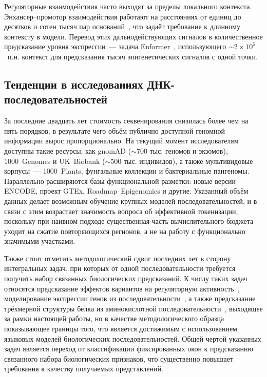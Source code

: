 Регуляторные взаимодействия часто выходят за пределы локального
контекста. Энхансер--промотор взаимодействия работают на расстояниях
от единиц до десятков и сотен тысяч пар
оснований~\cite{schoenfelderLongrangeEnhancerPromoter2019}, что задаёт
требование к длинному контексту в модели. Перевод этих
дальнодействующих сигналов в количественное предсказание уровня
экспрессии~--- задача
Enformer~\cite{avsecEffectiveGeneExpression2021}, использующего
${\sim}2 \times 10^5$~п.н. контекст для предсказания тысяч
эпигенетических сигналов с одной точки.

\subsection{Тенденции в исследованиях ДНК-последовательностей}

За последние двадцать лет стоимость секвенирования снизилась более чем
на пять порядков, в результате чего объём публично доступной геномной
информации вырос пропорционально. На текущий момент исследователям
доступны такие ресурсы, как gnomAD ($\sim$700 тыс. геномов и экзомов),
1000~Genomes и UK~Biobank ($\sim$500 тыс. индивидов), а также
мультивидовые корпусы~--- 1000~Plants, фунгальные коллекции и
бактериальные пангеномы. Параллельно расширяются базы функциональной
разметки: новые версии ENCODE, проект GTEx, Roadmap~Epigenomics и
другие. Указанный объём данных делает возможным обучение крупных
моделей последовательностей, и в связи с этим возрастает значимость
вопроса об эффективной токенизации, поскольку при наивном подходе
существенная часть вычислительного бюджета уходит на сжатие
повторяющихся регионов, а не на работу с функционально значимыми
участками.

Также стоит отметить методологический сдвиг последних лет в сторону
интегральных задач, при которых от одной последовательности требуется
получить набор связанных биологических предсказаний. К числу таких
задач относятся предсказание эффектов вариантов на регуляторную
активность~\cite{patel2025dartevalcomprehensivednalanguage,
avsecAlphaGenomeAdvancingRegulatory2025}, моделирование экспрессии
генов из последовательности~\cite{avsecEffectiveGeneExpression2021},
а также предсказание трёхмерной структуры белка из аминокислотной
последовательности~\cite{jumperHighlyAccurateProtein2021}, выходящее
за рамки настоящей работы, но в качестве методологического образца
показывающее границы того, что является достижимым с использованием
языковых моделей биологических последовательностей. Общей чертой
указанных задач является переход от классификации фиксированных окон
к предсказанию связанного набора биологических признаков, что
существенно повышает требования к качеству получаемых представлений.

